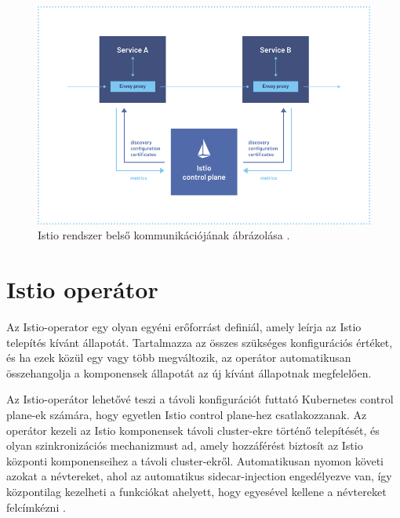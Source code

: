 \begin{figure}[ht]
    \centering
         \includegraphics[width=1.0\textwidth]{figures/istio/service-mesh.png}
          \caption{Istio rendszer belső kommunikációjának ábrázolása \cite{istioSM}.}
           \label{service-mesh}
\end{figure}

\section{Istio operátor}
Az Istio-operator egy olyan egyéni erőforrást definiál, amely leírja az Istio telepítés kívánt állapotát.
Tartalmazza az összes szükséges konfigurációs értéket, és ha ezek közül egy vagy több megváltozik, az operátor automatikusan összehangolja a komponensek állapotát az új kívánt állapotnak megfelelően.

Az Istio-operátor lehetővé teszi a távoli konfigurációt futtató Kubernetes control plane-ek számára, hogy egyetlen Istio control plane-hez csatlakozzanak.
Az operátor kezeli az Istio komponensek távoli cluster-ekre történő telepítését, és olyan szinkronizációs mechanizmust ad, amely hozzáférést biztosít az Istio központi komponenseihez a távoli cluster-ekről.
Automatikusan nyomon követi azokat a névtereket, ahol az automatikus sidecar-injection engedélyezve van, így központilag kezelheti a funkciókat ahelyett, hogy egyesével kellene a névtereket felcímkézni \cite{banzaicloudOp}.

